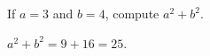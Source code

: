 \question If $a = 3$ and $b = 4$, compute $a^2 + b^2$.
\begin{solution}
$a^2 + b^2 = 9 + 16 = 25$.
\end{solution}
